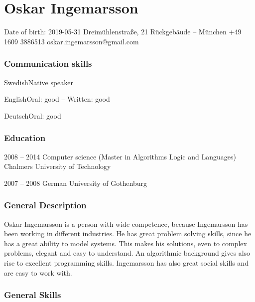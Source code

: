 \documentclass[fontsize=10pt]{tccv}
\begin{document}
\part{Oskar Ingemarsson}

\personal
    {Date of birth: 2019-05-31}
    {Dreimühlenstra{\ss}e, 21 Rückgebäude -- München}
    {+49 1609 3886513}
    {oskar.ingemarsson@gmail.com}

\section{Communication skills}

\begin{factlist}
\item{Swedish}{Native speaker}
\item{English}{Oral: good -- Written: good}
\item{Deutsch}{Oral: good}
\end{factlist}

\section{Education}

\begin{yearlist}
\item{2008 -- 2014}
     {Computer science (Master in Algorithms Logic and Languages)}
     {Chalmers University of Technology}
\item{2007 -- 2008}
    {German}
    {University of Gothenburg}
\end{yearlist}

\section{General Description}
Oskar Ingemarsson is a person with wide competence, because Ingemarsson has
been working in different industries. He has great problem solving skills,
since he has a great ability to model systems. This makes his solutions, even
to complex problems, elegant and easy to understand. An algorithmic background
gives also rise to excellent programming skills. Ingemarsson has also great
social skills and are easy to work with.


\section{General Skills}
\end{document}
